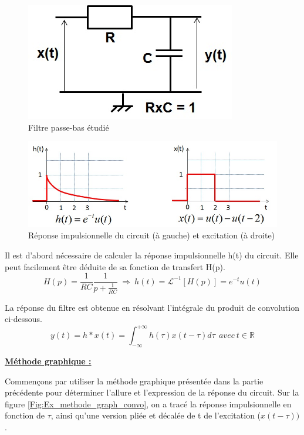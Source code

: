 	\begin{figure}[h!]
		\centering
		\includegraphics[scale=0.5]{images/Ex_passe_bas_convolution.jpg}
		\caption{Filtre passe-bas étudié}	
		\label{Fig:Circuit_passe_bas_convo} 
	\end{figure}

	\begin{figure}[h!]
		\centering
		\includegraphics[scale=0.5]{images/Ex_excitation_passe_bas_convo.jpg}
		\caption{Réponse impulsionnelle du circuit (à gauche) et excitation (à droite)}	
		\label{Fig:Excitation_passe_bas_convo} 
	\end{figure}

	Il est d'abord nécessaire de calculer la réponse impulsionnelle h(t) du circuit. Elle peut facilement être déduite de sa fonction de transfert H(p).
	\begin{equation}\label{key}
	H(p)=\frac{1}{RC}\frac{1}{p+\frac{1}{RC}}~\Longrightarrow~h(t)=\mathcal{L}^{-1}[H(p)]=e^{-t}u(t)
	\end{equation}
	
	La réponse du filtre est obtenue en résolvant l'intégrale du produit de convolution ci-dessous. 
	\begin{equation}\label{convo_filtre_exemple}
	y(t)=h*x(t)=\int_{-\infty}^{+\infty}h(\tau)x(t-\tau)d\tau~~avec~t \in \mathbb{R}
	\end{equation}
	
	\vspace{1\baselineskip}
	\textbf{\underline{Méthode graphique :}}
	
	Commençons par utiliser la méthode graphique présentée dans la partie précédente pour déterminer l'allure et l'expression de la réponse du circuit. Sur la figure \ref{Fig:Ex_methode_graph_convo}, on a tracé la réponse impulsionnelle en fonction de $\tau$, ainsi qu'une version pliée et décalée de t de l'excitation ($x(t-\tau))$.  
	
